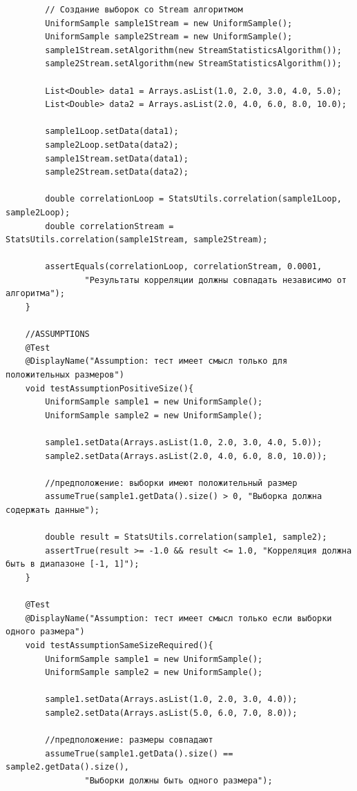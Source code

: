 \begin{verbatim}
        // Создание выборок со Stream алгоритмом
        UniformSample sample1Stream = new UniformSample();
        UniformSample sample2Stream = new UniformSample();
        sample1Stream.setAlgorithm(new StreamStatisticsAlgorithm());
        sample2Stream.setAlgorithm(new StreamStatisticsAlgorithm());

        List<Double> data1 = Arrays.asList(1.0, 2.0, 3.0, 4.0, 5.0);
        List<Double> data2 = Arrays.asList(2.0, 4.0, 6.0, 8.0, 10.0);

        sample1Loop.setData(data1);
        sample2Loop.setData(data2);
        sample1Stream.setData(data1);
        sample2Stream.setData(data2);

        double correlationLoop = StatsUtils.correlation(sample1Loop, sample2Loop);
        double correlationStream = StatsUtils.correlation(sample1Stream, sample2Stream);

        assertEquals(correlationLoop, correlationStream, 0.0001,
                "Результаты корреляции должны совпадать независимо от алгоритма");
    }

    //ASSUMPTIONS
    @Test
    @DisplayName("Assumption: тест имеет смысл только для положительных размеров")
    void testAssumptionPositiveSize(){
        UniformSample sample1 = new UniformSample();
        UniformSample sample2 = new UniformSample();

        sample1.setData(Arrays.asList(1.0, 2.0, 3.0, 4.0, 5.0));
        sample2.setData(Arrays.asList(2.0, 4.0, 6.0, 8.0, 10.0));

        //предположение: выборки имеют положительный размер
        assumeTrue(sample1.getData().size() > 0, "Выборка должна содержать данные");

        double result = StatsUtils.correlation(sample1, sample2);
        assertTrue(result >= -1.0 && result <= 1.0, "Корреляция должна быть в диапазоне [-1, 1]");
    }

    @Test
    @DisplayName("Assumption: тест имеет смысл только если выборки одного размера")
    void testAssumptionSameSizeRequired(){
        UniformSample sample1 = new UniformSample();
        UniformSample sample2 = new UniformSample();

        sample1.setData(Arrays.asList(1.0, 2.0, 3.0, 4.0));
        sample2.setData(Arrays.asList(5.0, 6.0, 7.0, 8.0));

        //предположение: размеры совпадают
        assumeTrue(sample1.getData().size() == sample2.getData().size(),
                "Выборки должны быть одного размера");


\end{verbatim}

